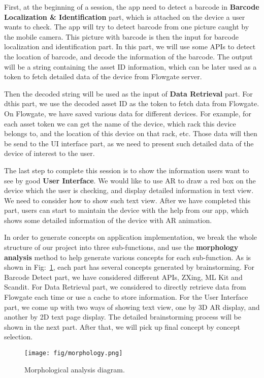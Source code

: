 \documentclass[11pt,a4paper]{article}
\begin{document}
\begin{onehalfspace}
First, at the beginning of a session, the app need to detect a barcode in \textbf{Barcode Localization \& Identification} part, which is attached on the device a user wants to check. The app will try to detect barcode from one picture caught by the mobile camera. This picture with barcode is then the input for barcode localization and identification part. In this part, we will use some APIs to detect the location of barcode, and decode the information of the barcode. The output will be a string containing the asset ID information, which can be later used as a token to fetch detailed data of the device from Flowgate server.

Then the decoded string will be used as the input of \textbf{Data Retrieval} part. For dthis part, we use the decoded asset ID as the token to fetch data from Flowgate. On Flowgate, we have saved various data for different devices. For example, for each asset token we can get the name of the device, which rack this device belongs to, and the location of this device on that rack, etc. Those data will then be send to the UI interface part, as we need to present such detailed data of the device of interest to the user.

The last step to complete this session is to show the information users want to see by good \textbf{User Interface}. We would like to use AR to draw a red box on the device which the user is checking, and display detailed information in text view. We need to consider how to show such text view. After we have completed this part, users can start to maintain the device with the help from our app, which shows some detailed information of the device with AR animation.


In order to generate concepts on application implementation, we break the whole structure of our project into three sub-functions, and use the \textbf{morphology analysis} method to help generate various concepts for each sub-function. As is shown in Fig:~\ref{morph}, each part has several concepts generated by brainstorming. For Barcode Detect part, we have considered different APIs, ZXing, ML Kit and Scandit. For Data Retrieval part, we considered to directly retrieve data from Flowgate each time or use a cache to store information. For the User Interface part, we come up with two ways of showing text view, one by 3D AR display, and another by 2D text page display. The detailed brainstorming process will be shown in the next part. After that, we will pick up final concept by concept selection.

\begin{figure}[H]
	\centering
	\texttt{[image: fig/morphology.png]}
	\caption{Morphological analysis diagram.}
	\label{morph}
\end{figure}




\end{onehalfspace}
\end{document}
